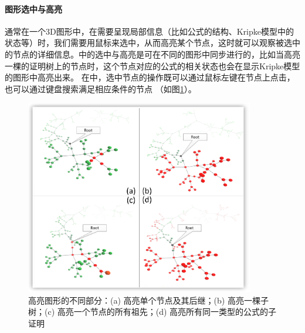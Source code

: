 \paragraph{图形选中与高亮}
通常在一个3D图形中，在需要呈现局部信息（比如公式的结构、Kripke模型中的状态等）时，我们需要用鼠标来选中，从而高亮某个节点，这时就可以观察被选中的节点的详细信息。中的选中与高亮是可在不同的图形中同步进行的，比如当高亮一棵\sctlprov{}的证明树上的节点时，这个节点对应的公式的相关状态也会在显示Kripke模型的图形中高亮出来。 在中，选中节点的操作既可以通过鼠标左键在节点上点击，也可以通过键盘搜索满足相应条件的节点 （如图\ref{vmdv:prooftree:high:different}）。
\begin{figure}[h!]
	\centering
	\includegraphics[width=10cm]{Img/high_different.png}
	\caption{高亮图形的不同部分：(a) 高亮单个节点及其后继；(b) 高亮一棵子树；(c) 高亮一个节点的所有祖先；(d) 高亮所有同一类型的公式的子证明}
	\label{vmdv:prooftree:high:different}
\end{figure}

